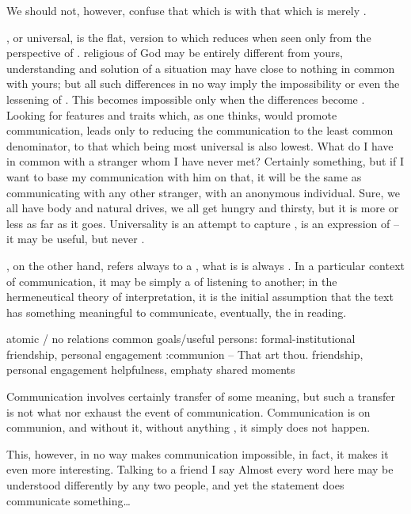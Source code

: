 \pa 
We should not, however, confuse that which is  with that
which is merely . 
{, or universal, is the flat, 
 version to which  reduces when seen only 
from the perspective of .
 religious  of 
God may be entirely different from yours,  understanding and 
solution of a situation may have close to nothing in common with 
yours; but all such differences in no way imply the impossibility or 
even the lessening of . This becomes impossible only when 
the  differences become . Looking for 
 features and traits which, as one thinks, would promote 
communication, leads only to reducing the communication to the least 
common denominator, to that which being most universal is also lowest. 
What do I have in common with a stranger whom I have never met? 
Certainly something, but if I want to base my communication with him 
on that, it will be the same as communicating with any other 
stranger, with an anonymous individual. Sure, we all have body and 
natural drives, we all get hungry and thirsty, but it is more or less 
as far as it goes. Universality is an attempt to capture , is 
an expression of  -- it may be useful, 
but never .

\pa
{}, on the other hand, refers always to a , what is  is always  .
In a particular context of communication, it may be simply a  of listening to another; in the hermeneutical theory of 
interpretation, it is the initial assumption that the text has 
something meaningful to communicate, eventually, the 
 in reading.




    {atomic / no relations}
    {common goals/useful persons: formal-institutional}
    {friendship, personal engagement}
{:communion -- That art thou.}
    {friendship, personal engagement}
    {helpfulness, emphaty}
    {shared moments}
 
\say
Communication involves certainly transfer of some meaning, but such a 
transfer is not what  nor exhaust the event of 
communication. Communication is  on communion, and without 
it, without anything , it simply does not happen. 

This, however, in no way makes communication impossible, in fact, 
it makes it even more interesting. Talking to a friend I say  Almost 
every word here may be understood differently by any two people, and 
yet the statement does communicate something\ldots

}

